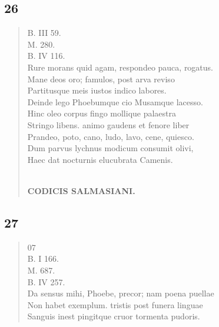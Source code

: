 \documentclass[11pt, a4paper]{report}
\begin{document}
            \subsection*{26}
      \begin{verse}
      B. III 59. \\ M. 280. \\ B. IV 116. \\ Rure morans quid agam, respondeo pauca, rogatus. \\ Mane deos oro; famulos, post arva reviso \\ Partitusque meis iustos indico labores. \\ Deinde lego Phoebumque cio Musamque lacesso. \\ Hinc oleo corpus fingo mollique palaestra \\ Stringo libens. animo gaudens et fenore liber \\ Prandeo, poto, cano, ludo, lavo, cene, quiesco. \\ Dum parvus lychnus modicum consumit olivi, \\ Haec dat nocturnis elucubrata Camenis. \\ 
        ﻿\pagebreak 
    \begin{center} \textbf{CODICIS SALMASIANI.} \end{center} \marginpar{[99]} 
      \end{verse}
  
            \subsection*{27}
      \begin{verse}
      07 \\ B. I 166. \\ M. 687. \\ B. IV 257. \\ Da sensus mihi, Phoebe, precor; nam poena puellae \\ Non habet exemplum. tristis post funera linguae \\ Sanguis inest pingitque cruor tormenta pudoris. \\ 
      \end{verse}
  
\end{document}

